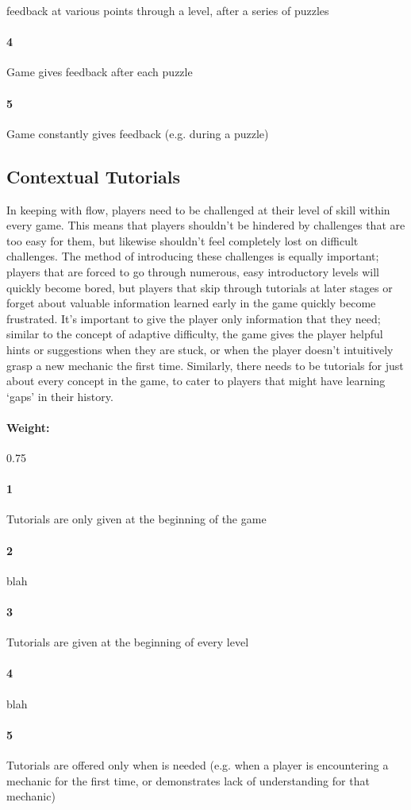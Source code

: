 feedback at various points through a level, after a series of puzzles\paragraph{4}Game gives feedback after each puzzle\paragraph{5}Game constantly gives feedback (e.g. during a puzzle)\subsection{Contextual Tutorials}{In keeping with flow, players need to be challenged at their level of skill within every game. This means that players shouldn't be hindered by challenges that are too easy for them, but likewise shouldn't feel completely lost on difficult challenges. The method of introducing these challenges is equally important; players that are forced to go through numerous, easy introductory levels will quickly become bored, but players that skip through tutorials at later stages or forget about valuable information learned early in the game quickly become frustrated. It's important to give the player only information that they need; similar to the concept of adaptive difficulty, the game gives the player helpful hints or suggestions when they are stuck, or when the player doesn't intuitively grasp a new mechanic the first time. Similarly, there needs to be tutorials for just about every concept in the game, to cater to players that might have learning ‘gaps' in their history.} \paragraph{Weight:}{0.75}\paragraph{1}Tutorials are only given at the beginning of the game\paragraph{2}blah\paragraph{3}Tutorials are given at the beginning of every level\paragraph{4}blah\paragraph{5}Tutorials are offered only when is needed (e.g. when a player is encountering a mechanic for the first time, or demonstrates lack of understanding for that mechanic)